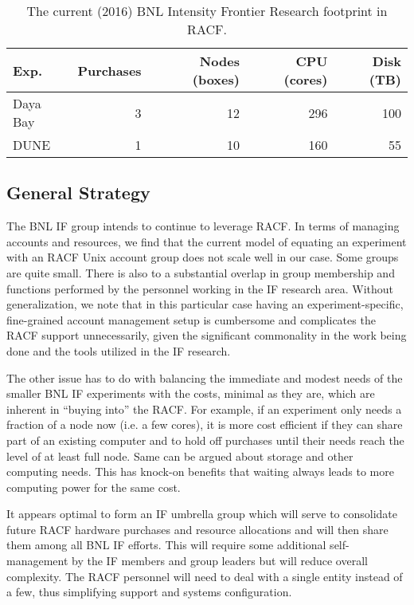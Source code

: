 \documentclass[pdftex,12pt,letter]{article}
\begin{document}
\begin{table}[tbh]
\centering
\begin{tabular}[h]{|l|r|r|r|r|}
  \hline
  Exp. & Purchases & Nodes (boxes) & CPU (cores) & Disk (TB) \\
  \hline
  Daya Bay & 3 & 12 & 296 & 100 \\
  \hline
  DUNE & 1 & 10 & 160 & 55 \\
  \hline
\end{tabular}
\caption{The current (2016) BNL Intensity Frontier Research footprint in RACF.}
\label{tab:bnlif_at_racf_2016}

\end{table}

\subsection{General Strategy}

The BNL IF group intends to continue to leverage RACF. In terms of managing accounts and resources,
we find that the current model of equating an experiment with an RACF Unix account group does not
scale well in our case. Some groups are quite small. There is also to a substantial overlap in group membership
and functions performed by the personnel working in the IF research area.
Without generalization, we note that in this particular case having an experiment-specific,
fine-grained account management setup is cumbersome and complicates the RACF support unnecessarily,
given the significant commonality in the work being done and the tools utilized in the IF research.

The other issue has to do with balancing the immediate and modest needs of
the smaller BNL IF experiments with the costs, minimal as they are, which are
inherent in ``buying into'' the RACF. For example, if an experiment only needs a fraction of a node now (i.e. a few cores),
it is more cost efficient if they can share part of an existing computer and to hold
off purchases until their needs reach the level of at least full node.
Same can be argued about storage and other computing needs.
This has knock-on benefits that waiting always leads to more computing
power for the same cost.

It appears optimal to form an IF umbrella group which will serve to consolidate future RACF hardware purchases
and resource allocations and will then share them among all BNL IF efforts. This will require some additional
self-management by the IF members and group leaders but will reduce overall complexity. The RACF personnel
will need to deal with a single entity instead of a few, thus simplifying support and systems configuration.
\end{document}
